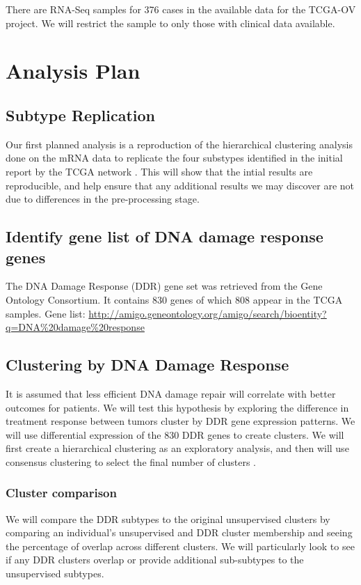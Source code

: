 \documentclass{article}
\begin{document}
There are RNA-Seq samples for 376 cases in the available data for the TCGA-OV project. We will restrict the sample to only those with clinical data available. 



\section{Analysis Plan}

\subsection{Subtype Replication}
   Our first planned analysis is a reproduction of the hierarchical clustering analysis\cite{eisen_cluster_1998} done on the mRNA data to replicate the four substypes identified in the initial report by the TCGA network \cite{cancer2011integrated}. This will show that the intial results are reproducible, and help ensure that any additional results we may discover are not due to differences in the pre-processing stage.
   
\subsection{Identify gene list of DNA damage response genes}

The DNA Damage Response (DDR) gene set was retrieved from the Gene Ontology Consortium.  It contains 830 genes of which 808 appear in the TCGA samples.
Gene list: \url{http://amigo.geneontology.org/amigo/search/bioentity?q=DNA\%20damage\%20response}


\subsection{Clustering by DNA Damage Response}
  It is assumed that less efficient DNA damage repair will correlate with better outcomes for patients. We will test this hypothesis by exploring the difference in treatment response between tumors cluster by DDR gene expression patterns. We will use differential expression of the 830 DDR genes to create clusters. We will first create a hierarchical clustering as an exploratory analysis, and then will use consensus clustering to select the final number of clusters \cite{monti_consensus_2003}. 

\subsubsection{Cluster comparison}
  We will compare the DDR subtypes to the original unsupervised clusters by comparing an individual's unsupervised and DDR cluster membership and seeing the percentage of overlap across different clusters. We will particularly look to see if any DDR clusters overlap or provide additional sub-subtypes to the unsupervised subtypes. 
 
\end{document}
